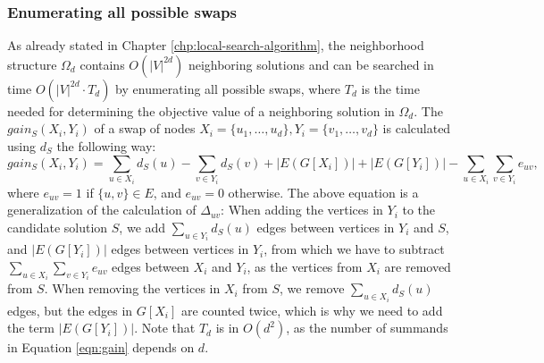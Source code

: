 \documentclass[draft,final]{vutinfth} %
\begin{document}
\subsubsection{Enumerating all possible swaps}
As already stated in Chapter \ref{chp:local-search-algorithm}, the neighborhood structure $\Omega_d$ contains $O(|V|^{2d})$ neighboring solutions and can be searched in time $O(|V|^{2d} \cdot T_d)$ by enumerating all possible swaps, where $T_d$ is the time needed for determining the objective value of a neighboring solution in $\Omega_d$. 
The $\mathit{gain_S}(X_i, Y_i)$ of a swap of nodes $X_i = \{u_1, \dots, u_d\}, Y_i = \{v_1, \dots, v_d\}$ is calculated using $d_S$ the following way: 
\begin{equation}\label{eqn:gain}
    \mathit{gain_S}(X_i, Y_i) = \sum_{u \in X_i} d_S(u) - \sum_{v \in Y_i} d_S(v) + |E(G[X_i])| + |E(G[Y_i])| - \sum_{u \in X_i} \sum_{v \in Y_i} e_{uv},
\end{equation}
where $e_{uv} = 1$ if $\{u,v\} \in E$, and $e_{uv} = 0$ otherwise. 
The above equation is a generalization of the calculation of $\Delta_{uv}$: When adding the vertices in $Y_i$ to the candidate solution $S$, we add $\sum_{u \in Y_i} d_S(u)$ edges between vertices in $Y_i$ and $S$, and $|E(G[Y_i])|$ edges between vertices in $Y_i$, from which we have to subtract $\sum_{u \in X_i} \sum_{v \in Y_i} e_{uv}$ edges between $X_i$ and $Y_i$, as the vertices from $X_i$ are removed from $S$. When removing the vertices in $X_i$ from $S$, we remove $\sum_{u \in X_i} d_S(u)$ edges, but the edges in $G[X_i]$ are counted twice, which is why we need to add the term $|E(G[Y_i])|$. Note that $T_d$ is in $O(d^2)$, as the number of summands in Equation \ref{eqn:gain} depends on $d$. 
\end{document}
